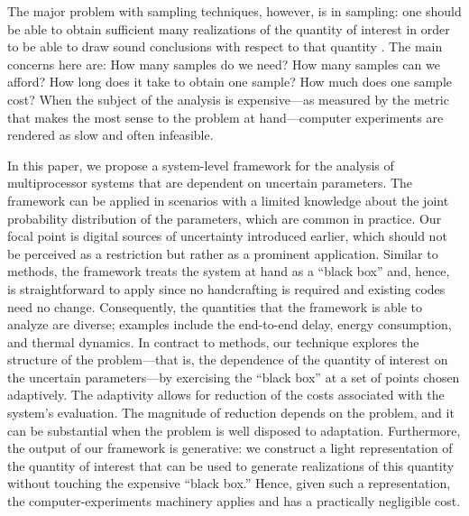 The major problem with sampling techniques, however, is in sampling: one should
be able to obtain sufficient many realizations of the quantity of interest in
order to be able to draw sound conclusions with respect to that quantity
\cite{diaz-emparanza2002}. The main concerns here are: How many samples do we
need? How many samples can we afford? How long does it take to obtain one
sample? How much does one sample cost? When the subject of the analysis is
expensive---as measured by the metric that makes the most sense to the problem
at hand---computer experiments are rendered as slow and often infeasible.

In this paper, we propose a system-level framework for the analysis of
multiprocessor systems that are dependent on uncertain parameters. The framework
can be applied in scenarios with a limited knowledge about the joint probability
distribution of the parameters, which are common in practice. Our focal point is
digital sources of uncertainty introduced earlier, which should not be perceived
as a restriction but rather as a prominent application. Similar to 
methods, the framework treats the system at hand as a ``black box'' and, hence,
is straightforward to apply since no handcrafting is required and existing codes
need no change. Consequently, the quantities that the framework is able to
analyze are diverse; examples include the end-to-end delay, energy consumption,
and thermal dynamics. In contract to  methods, our technique explores
the structure of the problem---that is, the dependence of the quantity of
interest on the uncertain parameters---by exercising the ``black box'' at a set
of points chosen adaptively. The adaptivity allows for reduction of the costs
associated with the system's evaluation. The magnitude of reduction depends on
the problem, and it can be substantial when the problem is well disposed to
adaptation. Furthermore, the output of our framework is generative: we construct
a light representation of the quantity of interest that can be used to generate
realizations of this quantity without touching the expensive ``black box.''
Hence, given such a representation, the computer-experiments machinery applies
and has a practically negligible cost.

